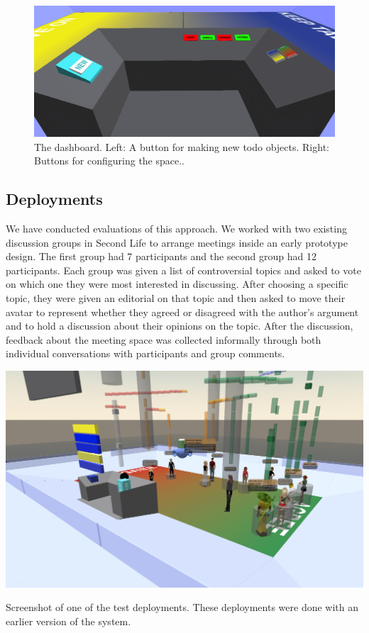 \begin{figure}[tp]
	\includegraphics{figures/dashboard.png}
	\caption{The dashboard. Left: A button for making new todo objects. Right: Buttons for configuring the space..}
	\label{fig:information_space_dashboard}
\end{figure}


\subsection{Deployments}
We have conducted evaluations of this approach. We worked with two existing discussion groups in Second Life to arrange meetings inside an early prototype design. The first group had 7 participants and the second group had 12 participants. Each group was given a list of controversial topics and asked to vote on which one they were most interested in discussing. After choosing a specific topic, they were given an editorial on that topic and then asked to move their avatar to represent whether they agreed or disagreed with the author's argument and to hold a discussion about their opinions on the topic. After the discussion, feedback about the meeting space was collected informally through both individual conversations with participants and group comments.

\begin{marginfigure}
	\includegraphics{figures/meeting_space_trial_1.jpg}
	\caption{Screenshot of one of the test deployments. These deployments were done with an earlier version of the system.}
	\label{fig:meeting_space_trial_1}
\end{marginfigure}

